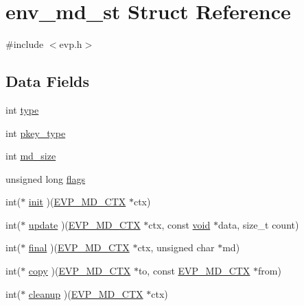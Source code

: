\hypertarget{structenv__md__st}{}\section{env\+\_\+md\+\_\+st Struct Reference}
\label{structenv__md__st}


{\ttfamily \#include $<$evp.\+h$>$}

\subsection*{Data Fields}
\begin{DoxyCompactItemize}
\item 
int \hyperlink{structenv__md__st_ac765329451135abec74c45e1897abf26}{type}
\item 
int \hyperlink{structenv__md__st_aceeaae2b1c209aa63672571f3ea4459f}{pkey\+\_\+type}
\item 
int \hyperlink{structenv__md__st_aca935efe0039c206602d9f27c2a6e148}{md\+\_\+size}
\item 
unsigned long \hyperlink{structenv__md__st_a9e339c2784bd040b26a5112866700bff}{flags}
\item 
int($\ast$ \hyperlink{structenv__md__st_aee41289d9c13995238b2b06ec0e0b7ab}{init} )(\hyperlink{crypto_2ossl__typ_8h_a69cda4d21bd068f01c469222c1dd92fe}{E\+V\+P\+\_\+\+M\+D\+\_\+\+C\+TX} $\ast$ctx)
\item 
int($\ast$ \hyperlink{structenv__md__st_a72478f17745f90449c81abc3cacd1eef}{update} )(\hyperlink{crypto_2ossl__typ_8h_a69cda4d21bd068f01c469222c1dd92fe}{E\+V\+P\+\_\+\+M\+D\+\_\+\+C\+TX} $\ast$ctx, const \hyperlink{hw__4758__cca_8h_afad4d591c7931ff6dc5bf69c76c96aa0}{void} $\ast$data, size\+\_\+t count)
\item 
int($\ast$ \hyperlink{structenv__md__st_ad2de4dcf71454b848a0d2c921f6ec09d}{final} )(\hyperlink{crypto_2ossl__typ_8h_a69cda4d21bd068f01c469222c1dd92fe}{E\+V\+P\+\_\+\+M\+D\+\_\+\+C\+TX} $\ast$ctx, unsigned char $\ast$md)
\item 
int($\ast$ \hyperlink{structenv__md__st_aca4867d63898ec8b6e73089bec954d9c}{copy} )(\hyperlink{crypto_2ossl__typ_8h_a69cda4d21bd068f01c469222c1dd92fe}{E\+V\+P\+\_\+\+M\+D\+\_\+\+C\+TX} $\ast$to, const \hyperlink{crypto_2ossl__typ_8h_a69cda4d21bd068f01c469222c1dd92fe}{E\+V\+P\+\_\+\+M\+D\+\_\+\+C\+TX} $\ast$from)
\item 
int($\ast$ \hyperlink{structenv__md__st_aabdc7487a89117b983e1be68d91e9632}{cleanup} )(\hyperlink{crypto_2ossl__typ_8h_a69cda4d21bd068f01c469222c1dd92fe}{E\+V\+P\+\_\+\+M\+D\+\_\+\+C\+TX} $\ast$ctx)

\end{DoxyCompactItemize}
